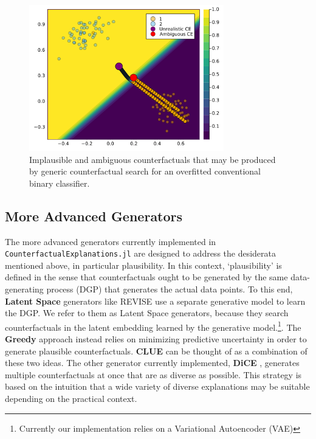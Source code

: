 \documentclass[
  letterpaper,
  DIV=11,
  numbers=noendperiod]{scrartcl}
\begin{document}
\begin{figure}

{\centering \includegraphics[width=3.33333in,height=2.5in]{www/binary_wrong.png}

}

\caption{\label{fig-binary-wrong}Implausible and ambiguous
counterfactuals that may be produced by generic counterfactual search
for an overfitted conventional binary classifier.}

\end{figure}

\hypertarget{more-advanced-generators}{%
\subsection{More Advanced Generators}\label{more-advanced-generators}}

The more advanced generators currently implemented in
\texttt{CounterfactualExplanations.jl} are designed to address the
desiderata mentioned above, in particular plausibility. In this context,
`plausibility' is defined in the sense that counterfactuals ought to be
generated by the same data-generating process (DGP) that generates the
actual data points. To this end, \textbf{Latent Space} generators like
REVISE \cite{joshi2019realistic} use a separate generative model to
learn the DGP. We refer to them as Latent Space generators, because they
search counterfactuals in the latent embedding learned by the generative
model.\footnote{Currently our implementation relies on a Variational
  Autoencoder (VAE)}. The \textbf{Greedy} approach
\cite{schut2021generating} instead relies on minimizing predictive
uncertainty in order to generate plausible counterfactuals.
\textbf{CLUE} \cite{antoran2020getting} can be thought of as a
combination of these two ideas. The other generator currently
implemented, \textbf{DiCE} \cite{mothilal2020explaining}, generates
multiple counterfactuals at once that are as diverse as possible. This
strategy is based on the intuition that a wide variety of diverse
explanations may be suitable depending on the practical context.
\end{document}
